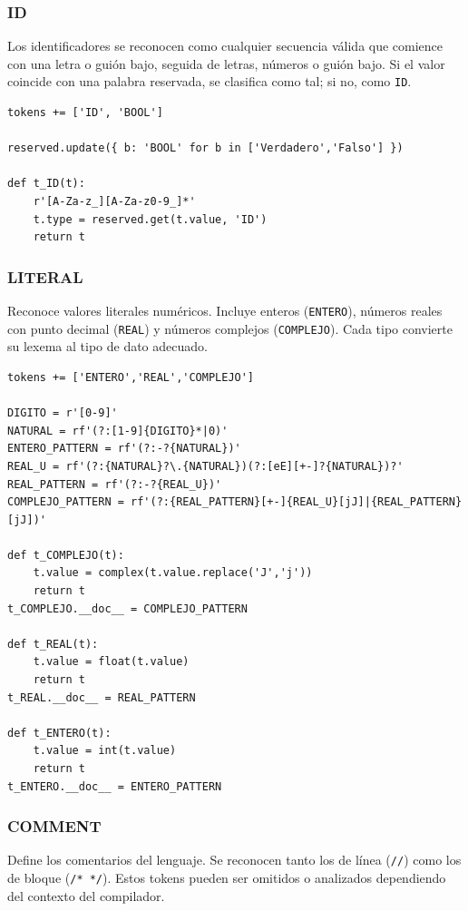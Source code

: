 \documentclass{article}
\begin{document}
\subsubsection{ID}

Los identificadores se reconocen como cualquier secuencia válida que comience con una letra o guión bajo, seguida de letras, números o guión bajo. Si el valor coincide con una palabra reservada, se clasifica como tal; si no, como \texttt{ID}.

\begin{lstlisting}[style=mypython]
tokens += ['ID', 'BOOL']

reserved.update({ b: 'BOOL' for b in ['Verdadero','Falso'] })

def t_ID(t):
    r'[A-Za-z_][A-Za-z0-9_]*'
    t.type = reserved.get(t.value, 'ID')
    return t
\end{lstlisting}

\subsubsection{LITERAL}

Reconoce valores literales numéricos. Incluye enteros (\texttt{ENTERO}), números reales con punto decimal (\texttt{REAL}) y números complejos (\texttt{COMPLEJO}). Cada tipo convierte su lexema al tipo de dato adecuado.

\begin{lstlisting}[style=mypython]
tokens += ['ENTERO','REAL','COMPLEJO']

DIGITO = r'[0-9]'
NATURAL = rf'(?:[1-9]{DIGITO}*|0)'
ENTERO_PATTERN = rf'(?:-?{NATURAL})'
REAL_U = rf'(?:{NATURAL}?\.{NATURAL})(?:[eE][+-]?{NATURAL})?'
REAL_PATTERN = rf'(?:-?{REAL_U})'
COMPLEJO_PATTERN = rf'(?:{REAL_PATTERN}[+-]{REAL_U}[jJ]|{REAL_PATTERN}[jJ])'

def t_COMPLEJO(t):
    t.value = complex(t.value.replace('J','j'))
    return t
t_COMPLEJO.__doc__ = COMPLEJO_PATTERN

def t_REAL(t):
    t.value = float(t.value)
    return t
t_REAL.__doc__ = REAL_PATTERN

def t_ENTERO(t):
    t.value = int(t.value)
    return t
t_ENTERO.__doc__ = ENTERO_PATTERN
\end{lstlisting}

\subsubsection{COMMENT}
Define los comentarios del lenguaje. Se reconocen tanto los de línea (\texttt{//}) como los de bloque (\texttt{/* */}). Estos tokens pueden ser omitidos o analizados dependiendo del contexto del compilador.
\end{document}
